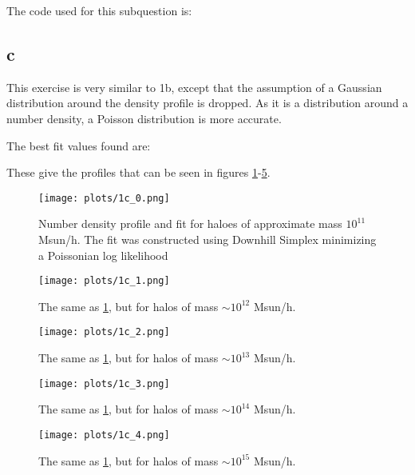 The code used for this subquestion is:


\subsection*{c}
This exercise is very similar to 1b, except that the assumption of a Gaussian distribution around the density profile is dropped.
As it is a distribution around a number density, a Poisson distribution is more accurate.

The best fit values found are:


These give the profiles that can be seen in figures \ref{fig:ex1c_0}-\ref{fig:ex1c_4}.
\begin{figure}
    \centering
    \texttt{[image: plots/1c\_0.png]}
    \caption{Number density profile and fit for haloes of approximate mass $10^{11}$ Msun/h. The fit was constructed using Downhill Simplex minimizing a Poissonian log likelihood}
    \label{fig:ex1c_0}
\end{figure}
\begin{figure}
    \centering
    \texttt{[image: plots/1c\_1.png]}
    \caption{The same as \ref{fig:ex1c_0}, but for halos of mass $\sim 10^{12}$ Msun/h.}
    \label{fig:ex1c_1}
\end{figure}
\begin{figure}
    \centering
    \texttt{[image: plots/1c\_2.png]}
    \caption{The same as \ref{fig:ex1c_0}, but for halos of mass $\sim 10^{13}$ Msun/h.}
    \label{fig:ex1c_2}
\end{figure}
\begin{figure}
    \centering
    \texttt{[image: plots/1c\_3.png]}
    \caption{The same as \ref{fig:ex1c_0}, but for halos of mass $\sim 10^{14}$ Msun/h.}
    \label{fig:ex1c_3}
\end{figure}
\begin{figure}
    \centering
    \texttt{[image: plots/1c\_4.png]}
    \caption{The same as \ref{fig:ex1c_0}, but for halos of mass $\sim 10^{15}$ Msun/h.}
    \label{fig:ex1c_4}
\end{figure}

